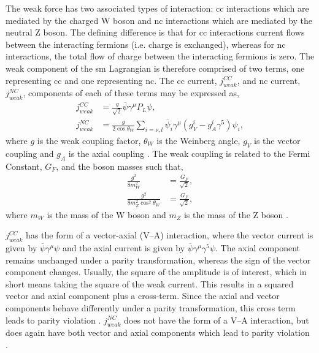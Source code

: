 The weak force has two associated types of interaction: \gls{cc} interactions which are mediated by the charged W boson and \gls{nc} interactions which are mediated by the neutral Z boson. The defining difference is that for \gls{cc} interactions current flows between the interacting fermions (i.e. charge is exchanged), whereas for \gls{nc} interactions, the total flow of charge between the interacting fermions is zero. The weak component of the \gls{sm} Lagrangian is therefore comprised of two terms, one representing \gls{cc} and one representing \gls{nc}. The \gls{cc} current, $j^{CC}_{weak}$,  and \gls{nc} current, $j^{NC}_{weak}$, components of each of these terms may be expressed as, 
\begin{equation}\label{eqn:weak current}
\begin{split}
    j^{CC}_{weak} &= \frac{g}{\sqrt{2}}\overline{\psi}\gamma^{\mu}P_L\psi, \\
    j^{NC}_{weak} &= \frac{g}{2\cos{\theta_W}}\sum_{i = \nu, l}
    \overline{\psi}_i \gamma^\mu (g_V^i - g_A^i \gamma^5)\psi_i, 
\end{split}
\end{equation}
where $g$ is the weak coupling factor, $\theta_W$ is the Weinberg angle, $g_V$ is the vector coupling and $g_A$ is the axial coupling \cite{Particles_and_Fundamental_Interactions:_An_Introduction_to_Particle_Physics}\cite{Fundamentals_of_Neutrino_Physics_and_Astrophysics}\cite{PDG_2022}. The weak coupling is related to the Fermi Constant, $G_F$, and the boson masses such that,
\begin{equation}
\begin{split}
    \frac{g^2}{8m^2_W} &= \frac{G_F}{\sqrt{2}}, \\
    \frac{g^2}{8m^2_Z\cos^2{\theta_W}} &= \frac{G_F}{\sqrt{2}},
\end{split}
\end{equation}
where $m_W$ is the mass of the W boson and $m_Z$ is the mass of the Z boson \cite{Fundamentals_of_Neutrino_Physics_and_Astrophysics}.

$j^{CC}_{weak}$ has the form of a vector-axial (V--A) interaction, where the vector current is given by $\overline{\psi}\gamma^\mu\psi$ and the axial current is given by $\overline{\psi}\gamma^\mu\gamma^5\psi$. The axial component remains unchanged under a parity transformation, whereas the sign of the vector component changes. Usually, the square of the amplitude is of interest, which in short means taking the square of the weak current. This results in a squared vector and axial component plus a cross-term. Since the axial and vector components behave differently under a parity transformation, this cross term leads to parity violation \cite{Particles_and_Fundamental_Interactions:_An_Introduction_to_Particle_Physics} \cite{Fundamentals_of_Neutrino_Physics_and_Astrophysics}. $j^{NC}_{weak}$ does not have the form of a V--A interaction, but does again have both vector and axial components which lead to parity violation \cite{Particles_and_Fundamental_Interactions:_An_Introduction_to_Particle_Physics}.

